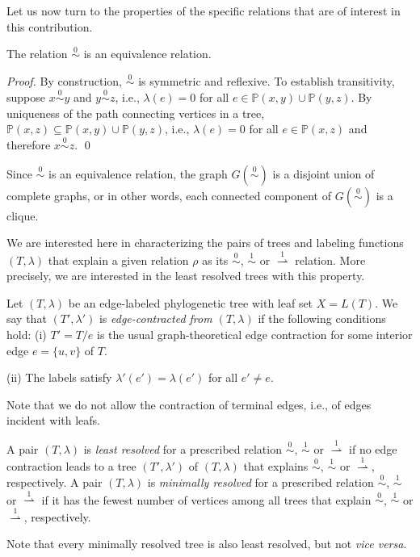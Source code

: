 \documentclass[smallextended]{svjour3}
\newcommand{\rev}[1]{\begingroup\color{blue}#1\endgroup}
\newcommand{\Ro}{\mathrel{\overset{0}{\sim}}}
\newcommand{\Rl}{\mathrel{\overset{1}{\sim}}}
\newcommand{\Rld}{\mathrel{\overset{1}{\rightharpoonup}}}
\begin{document}
Let us now turn to the properties of the specific relations that are of
interest in this contribution.

\begin{lemma}
  The relation $\Ro$ is an equivalence relation.
\end{lemma}
\begin{proof}
  By construction, $\Ro$ is symmetric and reflexive. To establish
  transitivity, suppose $x\Ro y$ and $y\Ro z$, i.e., $\lambda(e)=0$ for all
  $e\in \mathbb{P}(x,y)\cup \mathbb{P}(y,z)$. By uniqueness of the path
  connecting vertices in a tree, $\mathbb{P}(x,z)\subseteq
  \mathbb{P}(x,y)\cup \mathbb{P}(y,z)$, i.e., $\lambda(e)=0$ for all $e\in
  \mathbb{P}(x,z)$ and therefore $x \Ro z$. \qed
\end{proof}
Since $\Ro$ is an equivalence relation, the graph $G(\Ro)$ is a disjoint
union of complete graphs, or in other words, each connected component of
$G(\Ro)$ is a clique.

We are interested here in characterizing the pairs of trees and labeling
functions $(T,\lambda)$ that explain a given relation $\rho$ as its $\Ro$,
$\Rl$ or $\Rld$ relation. More precisely, we are interested in the least
resolved trees with this property.

\begin{definition} 
  Let $(T,\lambda)$ be an edge-labeled phylogenetic tree with leaf set
  $X=L(T)$. We say that $(T',\lambda')$ is \emph{edge-contracted from
  $(T,\lambda)$} if the following conditions hold: (i) $T'=T/e$ is the
  usual graph-theoretical edge contraction for some interior edge
  $e=\{u,v\}$ of $T$.
  
  \noindent (ii) The labels satisfy $\lambda'(e')=\lambda(e')$ for
  all $e'\ne e$.
\end{definition} 
Note that we do not allow the contraction of terminal edges, i.e., of edges
incident with leafs. 

\rev{
\begin{definition}
  A pair $(T,\lambda)$ is \emph{least resolved} for a prescribed relation
  $\Ro$, $\Rl$ or $\Rld$ if no edge contraction leads to a tree
  $(T',\lambda')$ of $(T,\lambda)$ that explains $\Ro$, $\Rl$ or $\Rld$,
  respectively.  A pair $(T,\lambda)$ is \emph{minimally resolved} for a
  prescribed relation $\Ro$, $\Rl$ or $\Rld$ if it has the fewest number of
  vertices among all trees that explain $\Ro$, $\Rl$ or $\Rld$,
  respectively.
\end{definition}
Note that every minimally resolved tree is also least resolved, but not
\textit{vice versa}.  }
\end{document}
